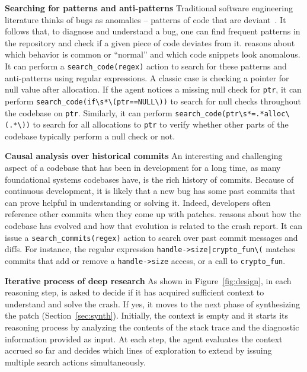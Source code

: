 \noindent\textbf{Searching for patterns and anti-patterns}
Traditional software engineering literature thinks of bugs as anomalies -- patterns of code that are deviant~\citep{deviant}. It follows that, to diagnose and understand a bug, one can find frequent patterns in the repository and check if a given piece of code deviates from it. \cresearcher{} reasons about which behavior is common or ``normal'' and which code snippets look anomalous. It can perform a \texttt{search\_code(regex)} action to search for these patterns and anti-patterns using regular expressions. A classic case is checking a pointer for null value after allocation. If the agent notices a missing null check for \texttt{ptr}, it can perform \texttt{search\_code(if\textbackslash{}s*\textbackslash{}(ptr==NULL\textbackslash{}))} to search for null checks throughout the codebase on \texttt{ptr}. Similarly, it can perform \texttt{search\_code(ptr\textbackslash{}s*=.*alloc\textbackslash{}(.*\textbackslash{}))} to search for all allocations to \texttt{ptr} to verify whether other parts of the codebase typically perform a null check or not.

\noindent\textbf{Causal analysis over historical commits}
An interesting and challenging aspect of a codebase that has been in development for a long time, as many foundational systems codebases have, is the rich history of commits. Because of continuous development, it is likely that a new bug has some past commits that can prove helpful in understanding or solving it. Indeed, developers often reference other commits when they come up with patches.
\cresearcher{} reasons about how the codebase has evolved and how that evolution is related to the crash report. It can issue a \texttt{search\_commits(regex)} action to search over past commit messages and diffs. 
For instance, the regular expression \texttt{handle->size|crypto\_fun\textbackslash{}(} matches commits that add or remove a \texttt{handle->size} access, or a call to \texttt{crypto\_fun}.

\noindent\textbf{Iterative process of deep research}
As shown in Figure~\ref{fig:design}, in each reasoning step, \cresearcher{} is asked to decide if it has acquired sufficient context to understand and solve the crash. If yes, it moves to the next phase of synthesizing the patch (Section~\ref{sec:synth}). Initially, the context is empty and it starts its reasoning process by analyzing the contents of the stack trace and the diagnostic information provided as input. 
At each step, the agent evaluates the context accrued so far and decides which lines of exploration to extend by issuing multiple search actions simultaneously.


